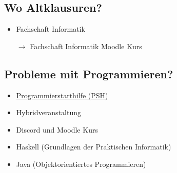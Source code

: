 \documentclass[
	aspectratio=169, 
	10pt 
]{beamer}
\begin{document}
\subsection{Wo Altklausuren?}
\begin{frame}{\insertsubsection}
    \begin{fancycolumns}[widths={30}]
        \nextcolumn

        \centering
        \begin{minipage}[C]{0.8\textwidth}
            \begin{itemize}
                \item Fachschaft Informatik
                \item[$\rightarrow$] Fachschaft Informatik Moodle Kurs 
            \end{itemize}
        \end{minipage}
    \end{fancycolumns}
\end{frame}

\subsection{Probleme mit Programmieren?}
\begin{frame}{\insertsubsection}
    \begin{fancycolumns}[widths={30}]
        \nextcolumn

        \centering
        \begin{minipage}[C]{0.8\textwidth}
            \begin{itemize}
                \item \underline{\href{https://moodle.uni-ulm.de/course/view.php?id=53212}{Programmierstarthilfe (PSH)}}
                \item Hybridveranstaltung
                \item Discord und Moodle Kurs 
                \item Haskell (Grundlagen der Praktischen Informatik)
                \item Java (Objektorientiertes Programmieren)
            \end{itemize}
        \end{minipage}
    \end{fancycolumns}
\end{frame}
\end{document}
